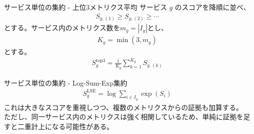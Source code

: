 \documentclass[dvipdfmx, 11pt, aspectratio=169, notheorems]{beamer}
\begin{document}
\begin{frame}{サービス単位の集約 - 上位3メトリクス平均}
    サービス $g$ のスコアを降順に並べ、
    \begin{align}
       S_{g,(1)} \ge S_{g,(2)} \ge \cdots
    \end{align}
    とする。サービス内のメトリクス数を$m_g=|I_g|$とし、
    \begin{align}
        K_g = \min(3,m_g)
    \end{align}とする。
    \begin{align}
        S_g^{\mathrm{top3}} = \frac{1}{K_g} \sum_{k=1}^{K_g} S_{g,(k)}
    \end{align}
\end{frame}

\begin{frame}{サービス単位の集約 - Log-Sum-Exp集約}
    \begin{align}
        S_g^{\mathrm{LSE}} = \log \sum_{i\in I_g} \exp(S_i)
    \end{align}
    これは大きなスコアを重視しつつ、複数のメトリクスからの証拠も加算する。\\
    ただし、同一サービス内のメトリクスは強く相関しているため、単純に証拠を足すと二重計上になる可能性がある。
\end{frame}
\end{document}
